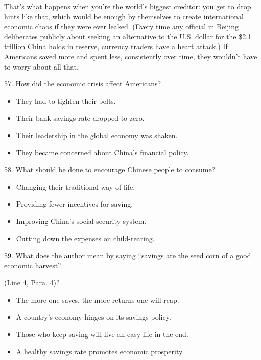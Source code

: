 \documentclass[UTF8,11pt]{ctexart}
\begin{document}
That’s what happens when you’re the world’s biggest creditor: you get to drop hints like that, which would be enough by themselves to create international economic chaos if they were ever leaked. (Every time any official in Beijing deliberates publicly about seeking an alternative to the U.S. dollar for the \$2.1 trillion China holds in reserve, currency traders have a heart attack.) If Americans saved more and spent less, consistently over time, they wouldn’t have to worry about all that.


57. How did the economic crisis affect Americans?


\begin{itemize}[leftmargin=2em,itemsep=.2em,topsep=.4em]\item[A.] They had to tighten their belts.
\item[B.] Their bank savings rate dropped to zero.
\item[C.] Their leadership in the global economy was shaken.
\item[D.] They became concerned about China’s financial policy.
\end{itemize}

58. What should be done to encourage Chinese people to consume?


\begin{itemize}[leftmargin=2em,itemsep=.2em,topsep=.4em]\item[A.] Changing their traditional way of life.
\item[B.] Providing fewer incentives for saving.
\item[C.] Improving China’s social security system.
\item[D.] Cutting down the expenses on child-rearing.
\end{itemize}

59. What does the author mean by saying “savings are the seed corn of a good economic harvest”


(Line 4, Para. 4)?


\begin{itemize}[leftmargin=2em,itemsep=.2em,topsep=.4em]\item[A.] The more one saves, the more returns one will reap.
\item[B.] A country’s economy hinges on its savings policy.
\item[C.] Those who keep saving will live an easy life in the end.
\item[D.] A healthy savings rate promotes economic prosperity.
\end{itemize}
\end{document}
